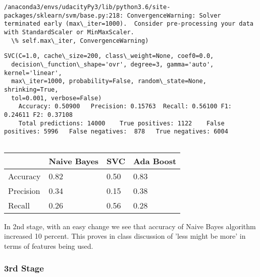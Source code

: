 \documentclass[11pt]{article}
\begin{document}
    \begin{Verbatim}[commandchars=\\\{\}]
/anaconda3/envs/udacityPy3/lib/python3.6/site-packages/sklearn/svm/base.py:218: ConvergenceWarning: Solver terminated early (max\_iter=1000).  Consider pre-processing your data with StandardScaler or MinMaxScaler.
  \% self.max\_iter, ConvergenceWarning)

    \end{Verbatim}

    \begin{Verbatim}[commandchars=\\\{\}]
SVC(C=1.0, cache\_size=200, class\_weight=None, coef0=0.0,
  decision\_function\_shape='ovr', degree=3, gamma='auto', kernel='linear',
  max\_iter=1000, probability=False, random\_state=None, shrinking=True,
  tol=0.001, verbose=False)
	Accuracy: 0.50900	Precision: 0.15763	Recall: 0.56100	F1: 0.24611	F2: 0.37108
	Total predictions: 14000	True positives: 1122	False positives: 5996	False negatives:  878	True negatives: 6004


    \end{Verbatim}

    \begin{longtable}[]{@{}llll@{}}
\toprule
& Naive Bayes & SVC & Ada Boost\tabularnewline
\midrule
\endhead
Accuracy & 0.82 & 0.50 & 0.83\tabularnewline
Precision & 0.34 & 0.15 & 0.38\tabularnewline
Recall & 0.26 & 0.56 & 0.28\tabularnewline
\bottomrule
\end{longtable}

    In 2nd stage, with an easy change we see that accuracy of Naive Bayes
algorithm increased 10 percent. This proves in class discussion of 'less
might be more' in terms of features being used.

    \subsubsection{3rd Stage}\label{rd-stage}
\end{document}
